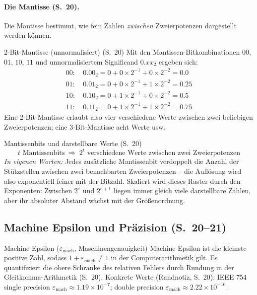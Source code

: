 \paragraph{Die Mantisse (S.~20).} Die Mantisse bestimmt, wie fein Zahlen \emph{zwischen} Zweierpotenzen dargestellt werden können.

\begin{bspbox}{2-Bit-Mantisse (unnormalisiert) (S.~20)}
Mit den Mantissen-Bitkombinationen $00$, $01$, $10$, $11$ und unnormalisiertem Significand $0.xx_2$ ergeben sich:
\begin{align*}
00:\ & 0.00_2 = 0 + 0 \times 2^{-1} + 0 \times 2^{-2} = 0.0 \\
01:\ & 0.01_2 = 0 + 0 \times 2^{-1} + 1 \times 2^{-2} = 0.25 \\
10:\ & 0.10_2 = 0 + 1 \times 2^{-1} + 0 \times 2^{-2} = 0.5 \\
11:\ & 0.11_2 = 0 + 1 \times 2^{-1} + 1 \times 2^{-2} = 0.75
\end{align*}
Eine 2-Bit-Mantisse erlaubt also vier verschiedene Werte zwischen zwei beliebigen Zweierpotenzen; eine 3-Bit-Mantisse acht Werte usw.
\end{bspbox}

\begin{satzbox}{Mantissenbits und darstellbare Werte (S.~20)}
\[
t \text{ Mantissenbits} \;\Rightarrow\; 2^t \text{ verschiedene Werte zwischen zwei Zweierpotenzen}
\]
\emph{In eigenen Worten:} Jedes zusätzliche Mantissenbit verdoppelt die Anzahl der Stützstellen zwischen zwei benachbarten Zweierpotenzen -- die Auflösung wird also exponentiell feiner mit der Bitzahl. Skaliert wird dieses Raster durch den Exponenten: Zwischen $2^e$ und $2^{e+1}$ liegen immer gleich viele darstellbare Zahlen, aber ihr absoluter Abstand wächst mit der Größenordnung.
\end{satzbox}

\subsection{Machine Epsilon und Präzision (S.~20--21)}

\begin{defbox}{Machine Epsilon ($\varepsilon_{\text{mach}}$, Maschinengenauigkeit)}
Machine Epsilon ist die kleinste positive Zahl, sodass $1 + \varepsilon_{\text{mach}} \neq 1$ in der Computerarithmetik gilt. Es quantifiziert die obere Schranke des relativen Fehlers durch Rundung in der Gleitkomma-Arithmetik (S.~20). Konkrete Werte (Randnotiz, S.~20): IEEE 754 single precision $\varepsilon_{\text{mach}} \approx 1.19 \times 10^{-7}$; double precision $\varepsilon_{\text{mach}} \approx 2.22 \times 10^{-16}$.
\end{defbox}

